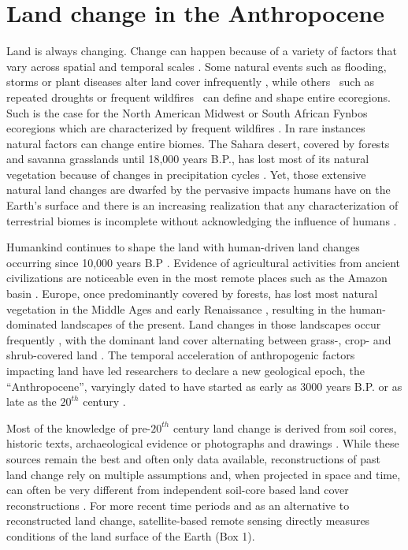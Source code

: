 \section{Land change in the Anthropocene}
\label{C01_01}

Land is always changing. Change can happen because of a variety of factors that vary across spatial and temporal scales \citep{Lambin2003,Kennedy2014}. Some natural events such as flooding, storms or plant diseases alter land cover infrequently \citep{Turner1998}, while others \textendash\ such as repeated droughts or frequent wildfires \textendash\ can define and shape entire ecoregions. Such is the case for the North American Midwest or South African Fynbos ecoregions which are characterized by frequent wildfires \citep{Westerling2006,Kelly2017}. In rare instances natural factors can change entire biomes. The Sahara desert, covered by forests and savanna grasslands until 18,000 years B.P., has lost most of its natural vegetation because of changes in precipitation cycles \citep{Hamilton1981}. Yet, those extensive natural land changes are dwarfed by the pervasive impacts humans have on the Earth’s surface and there is an increasing realization that any characterization of terrestrial biomes is incomplete without acknowledging the influence of humans \citep{Ellis2008,Kehoe2017}.

Humankind continues to shape the land \citep{Ellis2011,Ellis2013} with human-driven land changes occurring since 10,000 years B.P \citep{Ellis2013}. Evidence of agricultural activities from ancient civilizations are noticeable even in the most remote places such as the Amazon basin \citep{McMichael2017}. Europe, once predominantly covered by forests, has lost most natural vegetation in the Middle Ages and early Renaissance \citep{Kaplan2009}, resulting in the human-dominated landscapes of the present. Land changes in those landscapes occur frequently \citep{Kleyer2007}, with the dominant land cover alternating between grass-, crop- and shrub-covered land \citep{Kleyer2007,Manning2009}. The temporal acceleration of anthropogenic factors impacting land \citep{Steffen2015} have led researchers to declare a new geological epoch, the “Anthropocene”, varyingly dated to have started as early as 3000 years B.P. or as late as the $20^{th}$ century \citep{Ellis2013a}. 

Most of the knowledge of pre-$20^{th}$ century land change is derived from soil cores, historic texts, archaeological evidence or photographs and drawings \citep{KleinGoldewijk2011,KleinGoldewijk2016}. While these sources remain the best and often only data available, reconstructions of past land change rely on multiple assumptions \citep{KleinGoldewijk2013} and, when projected in space and time, can often be very different from independent soil-core based land cover reconstructions \citep{Kaplan2017}. For more recent time periods and as an alternative to reconstructed land change, satellite-based remote sensing directly measures conditions of the land surface of the Earth (Box 1).

